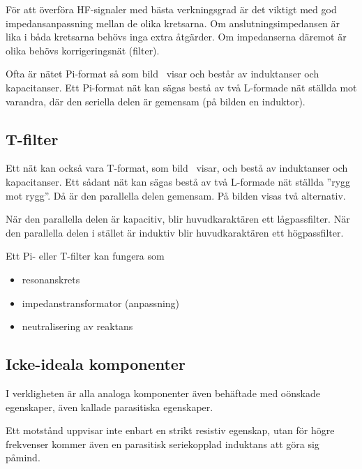 För att överföra HF-signaler med bästa verkningsgrad är det viktigt med god
impedansanpassning mellan de olika kretsarna.
Om anslutningsimpedansen är lika i båda kretsarna behövs inga extra åtgärder.
Om impedanserna däremot är olika behövs korrigeringsnät (filter).

Ofta är nätet Pi-format så som bild~ visar och består av
induktanser och kapacitanser.
Ett Pi-format nät kan sägas bestå av två L-formade nät ställda mot varandra, där
den seriella delen är gemensam (på bilden en induktor).

\subsection{T-filter}


Ett nät kan också vara T-format, som bild~ visar, och
bestå av induktanser och kapacitanser.
Ett sådant nät kan sägas bestå av två L-formade nät ställda ''rygg mot rygg''.
Då är den parallella delen gemensam.
På bilden visas två alternativ.

När den parallella delen är kapacitiv, blir huvudkaraktären ett lågpassfilter.
När den parallella delen i stället är induktiv blir huvudkaraktären ett
högpassfilter.

Ett Pi- eller T-filter kan fungera som
\begin{itemize}
  \item resonanskrets
  \item impedanstransformator (anpassning)
  \item neutralisering av reaktans
\end{itemize}

\subsection{Icke-ideala komponenter}

I verkligheten är alla analoga komponenter även behäftade med oönskade
egenskaper, även kallade parasitiska egenskaper.

Ett motstånd uppvisar inte enbart en strikt resistiv egenskap, utan för högre
frekvenser kommer även en parasitisk seriekopplad induktans att göra sig påmind.

